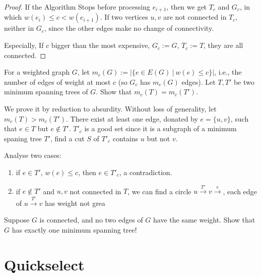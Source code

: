 \documentclass[11pt,a4paper,oneside]{article}
\begin{document}
\begin{problem}{1}
\begin{proof}
		If the Algorithm Stops before processing \(e_{i+1}\), then we get \(T_c\) and \(G_c\), in which \(w(e_{i}) \leq c < w(e_{i + 1})\). If two vertices \(u, v\) are not connected in \(T_c\), neither in \(G_c\), since the other edges make no change of connectivity.
		
		Especially, If \(c\) bigger than the most expensive, \(G_c := G\), \(T_c := T\), they are all connected.
	\end{proof}
\end{problem}

\begin{problem}{2}
	\statement
	For a weighted graph $G$, let $m_c(G) := | \{ e \in E(G) \ | \ w(e) \leq c\}|$, i.e.,
	the number of edges of weight at most $c$ (so $G_c$ has $m_c(G)$ edges).
	Let $T, T'$ be two minimum spanning trees of $G$. Show that
	$m_c(T) = m_c(T')$.

	\solution
	
	We prove it by reduction to absurdity. Without loss of generality, let \(m_c(T) > m_c(T')\). There exist at least one edge, donated by \(e = \{u, v\}\), such that \(e \in T\) but \(e \not\in T'\). \(T'_c\) is a good set since it is a subgraph of a minimum spaning tree \(T'\), find a cut \(S\) of \(T'_c\) contains \(u\) but not \(v\).
	
	Analyse two cases:
	
	\begin{enumerate}
		\item if \(e \in T'\), \(w(e) \leq c\), then \(e \in T'_c\), a contradiction.
		\item if \(e \not\in T'\) and \(u, v\) not connected in \(T\), we can find a circle \(u \xrightarrow{T'} v \xrightarrow{e}\), each edge of \(u \xrightarrow{T'} v\) has weight not grea
	\end{enumerate}
	
\end{problem}
\begin{problem}{3}
	\statement
	Suppose $G$ is connected, and no two edges of $G$ have the same weight. 
	Show that $G$ has exactly one minimum spanning tree!
	
	\solution
\end{problem}

\section*{Quickselect}
\end{document}
